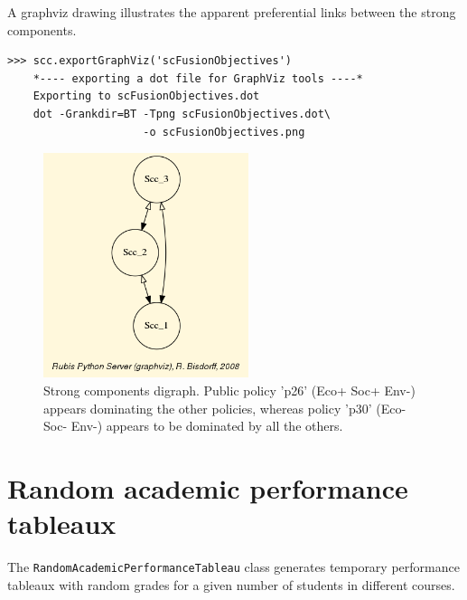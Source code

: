 A graphviz drawing illustrates the apparent preferential links between the strong components.
\begin{lstlisting}[basicstyle=\footnotesize]
   >>> scc.exportGraphViz('scFusionObjectives')
    *---- exporting a dot file for GraphViz tools ----*
    Exporting to scFusionObjectives.dot
    dot -Grankdir=BT -Tpng scFusionObjectives.dot\
                     -o scFusionObjectives.png
\end{lstlisting}
\begin{figure}[h]
\sidecaption
\includegraphics[width=6cm]{Figures/sccFusionObjectives.png}
\caption{Strong components digraph. Public policy 'p26' (Eco+ Soc+ Env-) appears dominating the other policies, whereas policy 'p30' (Eco- Soc- Env-) appears to be dominated by all the others.}
\label{fig:6.3}       %
\end{figure}
	   

\section{Random academic performance tableaux}
\label{sec:6.5}

The \texttt{RandomAcademicPerformanceTableau} class generates temporary performance tableaux with random grades for a given number of students in different courses. 

